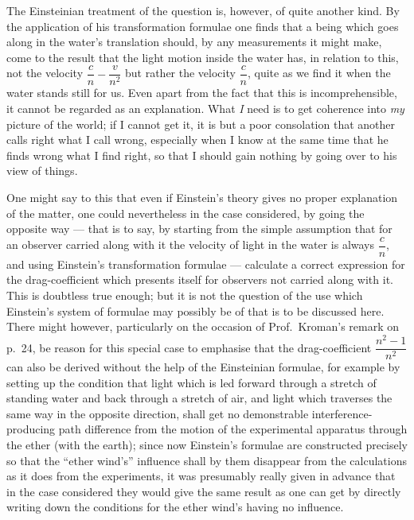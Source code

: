 \documentclass[12pt,a4paper]{article}
\begin{document}
The Einsteinian treatment of the question is, however, of quite another kind.
By the application of his transformation formulae one finds that a being which
goes along in the water's translation should, by any measurements it might
make, come to the result that the light motion inside the water has, in
relation to this, not the velocity
$\dfrac{c}{n} - \dfrac{v}{n^{2}}$ but rather the velocity $\dfrac{c}{n}$,
quite as we find it when the water stands still for us. Even apart from the
fact that this is incomprehensible, it cannot
be regarded as an explanation. What \emph{I} need is to get coherence into
\emph{my} picture of the world; if I cannot get it, it is but a poor
consolation that another calls right what I call wrong, especially when I know
at the same time that he finds wrong what I find right, so that I should gain
nothing by going over to his view of things.

One might say to this that even if Einstein's theory gives no proper
explanation of the matter, one could nevertheless in the case considered, by
going the opposite way --- that is to say, by starting from the simple
assumption that for an observer carried along with it the velocity of light in
the water is always $\dfrac{c}{n}$, and using Einstein's transformation
formulae --- calculate a correct expression for the drag-coefficient which
presents itself for observers not carried along with it. This is doubtless
true enough; but it is not the question of the use which Einstein's system of
formulae may possibly be of that is to be discussed here. There might however,
particularly on the occasion of Prof.\ Kroman's remark on p.~24, be reason for
this special case to emphasise that the drag-coefficient
$\dfrac{n^{2}-1}{n^{2}}$ can also be derived without the help of the
Einsteinian formulae, for example by setting up the condition that light which
is led forward through a stretch of standing water and back through a stretch
of air, and light which traverses the same way in the opposite direction,
shall get no demonstrable interference-producing path difference from the
motion of the experimental apparatus through the ether (with the earth); since
now Einstein's formulae are constructed precisely so that the ``ether wind's''
influence shall by them disappear from the calculations as it does from the
experiments, it was presumably really given in advance that in the case
considered they would give the same result as one can get by directly writing
down the conditions for the ether wind's having no influence.
\end{document}
